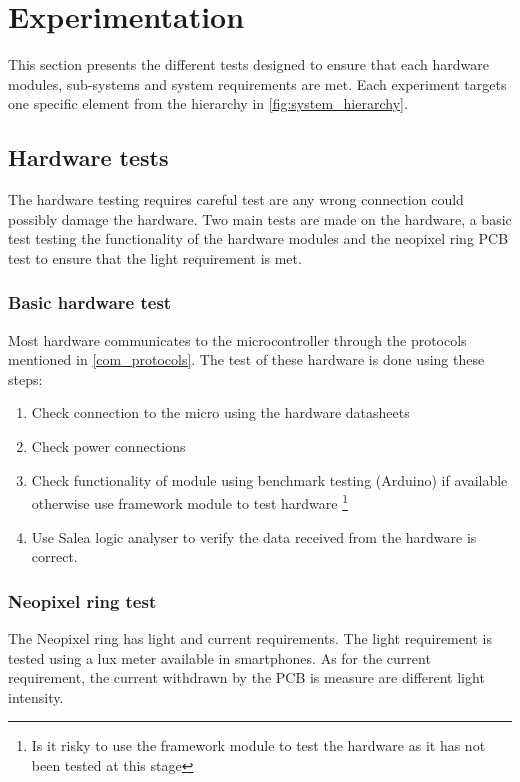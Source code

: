 \section{Experimentation}
This section presents the different tests designed to ensure that each hardware modules, sub-systems and system requirements are met. Each experiment targets one specific element from the hierarchy in \cref{fig:system_hierarchy}.
\subsection{Hardware tests}
The hardware testing requires careful test are any wrong connection could possibly damage the hardware. Two main tests are made on the hardware, a basic test testing the functionality of the hardware modules and the neopixel ring PCB test to ensure that the light requirement is met.
\subsubsection{Basic hardware test}\label{basic_hardware_test}
Most hardware communicates to the microcontroller through the protocols mentioned in \ref{com_protocols}. The test of these hardware is done using these steps:
\begin{enumerate}
\item Check connection to the micro using the hardware datasheets
\item Check power connections
\item Check functionality of module using benchmark testing (Arduino) if available otherwise use framework module to test hardware \footnote{Is it risky to use the framework module to test the hardware as it has not been tested at this stage}
\item Use Salea logic analyser to verify the data received from the hardware is correct.
\end{enumerate} 
\subsubsection{Neopixel ring test}
The Neopixel ring has light and current requirements. The light requirement is tested using a lux meter available in smartphones. As for the current requirement, the current withdrawn by the PCB is measure are different light intensity. 

